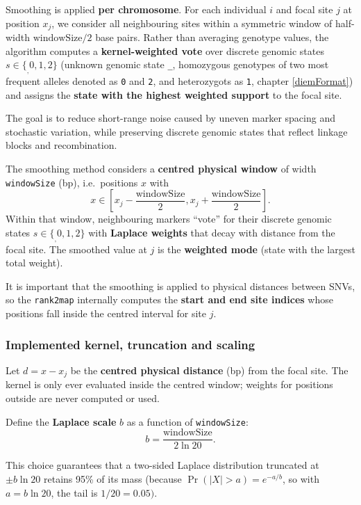 \documentclass[
]{book}
\begin{document}
Smoothing is applied \textbf{per chromosome}. For each individual \(i\) and focal site \(j\) at position \(x_j\), we consider all neighbouring sites within a symmetric window of half-width \(\text{windowSize}/2\) base pairs. Rather than averaging genotype values, the algorithm computes a \textbf{kernel-weighted vote} over discrete genomic states \(s \in \{_,0,1,2\}\) (unknown genomic state \texttt{\_}, homozygous genotypes of two most frequent alleles denoted as \texttt{0} and \texttt{2}, and heterozygots as \texttt{1}, chapter \ref{diemFormat}) and assigns the \textbf{state with the highest weighted support} to the focal site.

The goal is to reduce short-range noise caused by uneven marker spacing and stochastic variation, while preserving discrete genomic states that reflect linkage blocks and recombination.

The smoothing method considers a \textbf{centred physical window} of width \texttt{windowSize} (bp), i.e.~positions \(x\) with
\[
x \in \left[x_j - \frac{\text{windowSize}}{2}, x_j + \frac{\text{windowSize}}{2}\right].
\]
Within that window, neighbouring markers ``vote'' for their discrete genomic states \(s\in \{_,0,1,2\}\) with \textbf{Laplace weights} that decay with distance from the focal site. The smoothed value at \(j\) is the \textbf{weighted mode} (state with the largest total weight).

It is important that the smoothing is applied to physical distances between SNVs, so the \texttt{rank2map} internally computes the \textbf{start and end site indices} whose positions fall inside the centred interval for site \(j\).

\subsubsection{Implemented kernel, truncation and scaling}\label{implemented-kernel-truncation-and-scaling}

Let \(d = x - x_j\) be the \textbf{centred physical distance} (bp) from the focal site. The kernel is only ever evaluated inside the centred window; weights for positions outside are never computed or used.

Define the \textbf{Laplace scale} \(b\) as a function of \texttt{windowSize}:
\[
b = \frac{\text{windowSize}}{2 \ln 20}.
\]

This choice guarantees that a two-sided Laplace distribution truncated at \(\pm b\ln 20\) retains 95\% of its mass (because \(\Pr(|X|>a)=e^{-a/b}\), so with \(a=b\ln 20\), the tail is \(1/20=0.05)\).
\end{document}
